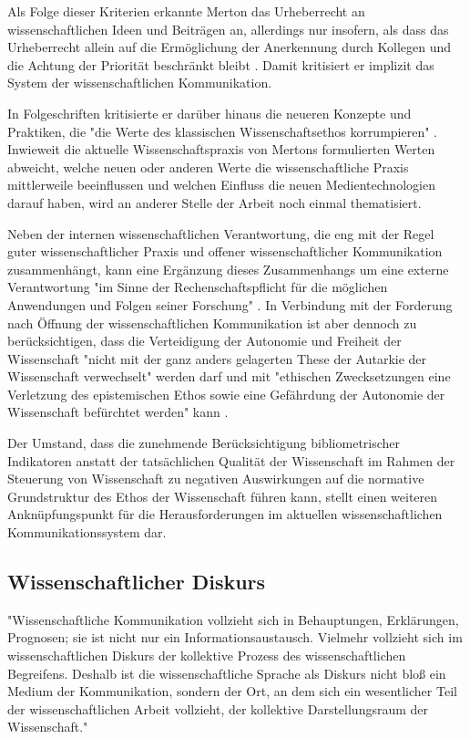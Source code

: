 Als Folge dieser Kriterien erkannte Merton das Urheberrecht an wissenschaftlichen Ideen und Beiträgen an, allerdings nur insofern, als dass das Urheberrecht allein auf die Ermöglichung der Anerkennung durch Kollegen und die Achtung der Priorität beschränkt bleibt \cite{Fangerau_2014}. Damit kritisiert er implizit das System der wissenschaftlichen Kommunikation.

In Folgeschriften kritisierte er darüber hinaus die neueren Konzepte und Praktiken, die "die Werte des klassischen Wissenschaftsethos korrumpieren" \cite{Froehlich_2009}. Inwieweit die aktuelle Wissenschaftspraxis von Mertons formulierten Werten abweicht, welche neuen oder anderen Werte die wissenschaftliche Praxis mittlerweile beeinflussen und welchen Einfluss die neuen Medientechnologien darauf haben, wird an anderer Stelle der Arbeit noch einmal thematisiert.

Neben der internen wissenschaftlichen Verantwortung, die eng mit der Regel guter wissenschaftlicher Praxis und offener wissenschaftlicher Kommunikation zusammenhängt, kann eine Ergänzung dieses Zusammenhangs um eine externe Verantwortung "im Sinne der Rechenschaftspflicht für die möglichen Anwendungen und Folgen seiner Forschung" \cite[:69]{Oezmen_2015}. In Verbindung mit der Forderung nach Öffnung der wissenschaftlichen Kommunikation ist aber dennoch zu berücksichtigen, dass die Verteidigung der Autonomie und Freiheit der Wissenschaft "nicht mit der ganz anders gelagerten These der Autarkie der Wissenschaft verwechselt" werden darf und mit "ethischen Zwecksetzungen eine Verletzung des epistemischen Ethos sowie eine Gefährdung der Autonomie der Wissenschaft befürchtet werden" kann \cite[:69]{Oezmen_2015}.

Der Umstand, dass die zunehmende Berücksichtigung bibliometrischer Indikatoren anstatt der tatsächlichen Qualität der Wissenschaft im Rahmen der Steuerung von Wissenschaft zu negativen Auswirkungen auf die normative Grundstruktur des Ethos der Wissenschaft führen kann, stellt einen weiteren Anknüpfungspunkt für die Herausforderungen im aktuellen wissenschaftlichen Kommunikationssystem dar.

\subsection{Wissenschaftlicher Diskurs}

"Wissenschaftliche Kommunikation vollzieht sich in Behauptungen, Erklärungen, Prognosen; sie ist nicht nur ein Informationsaustausch. Vielmehr vollzieht sich im wissenschaftlichen Diskurs der kollektive Prozess des wissenschaftlichen Begreifens. Deshalb ist die wissenschaftliche Sprache als Diskurs nicht bloß ein Medium der Kommunikation, sondern der Ort, an dem sich ein wesentlicher Teil der wissenschaftlichen Arbeit vollzieht, der kollektive Darstellungsraum der Wissenschaft." \cite[:95]{Boehme_1978}

